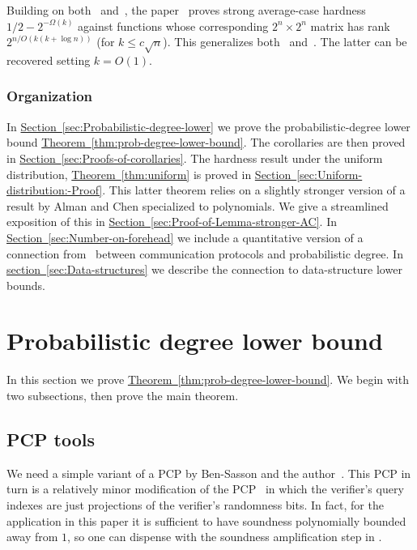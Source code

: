 \documentclass[11pt]{article}
\newcommand{\expref}[2]{\texorpdfstring{\hyperref[#2]{#1~\ref{#2}}}{#1~\ref{#2}}}
\begin{document}
Building on both~\cite{ChenLW2020-almost} and~\cite{DBLP:journals/corr/abs-2005-03123},
the paper~\cite{Huang-Viola-average-case-rigidity} proves strong
average-case hardness $1/2-2^{-\Omega(k)}$ against functions whose
corresponding $2^{n}\times2^{n}$ matrix has rank $2^{n/O(k(k+\log n))}$
(for $k\le c\sqrt{n}$). This generalizes both~\cite{ChenLW2020-almost}
and~\cite{DBLP:journals/corr/abs-2005-03123}. The latter can be recovered
setting $k=O(1)$.

\subsubsection{Organization}

In \expref{Section}{sec:Probabilistic-degree-lower} we prove the probabilistic-degree
lower bound \expref{Theorem}{thm:prob-degree-lower-bound}. The corollaries
are then proved in \expref{Section}{sec:Proofs-of-corollaries}. The hardness
result under the uniform distribution, \expref{Theorem}{thm:uniform}
is proved in \expref{Section}{sec:Uniform-distribution:-Proof}. This
latter theorem relies on a slightly stronger version of a result by
Alman and Chen specialized to polynomials. We give a streamlined exposition
of this in \expref{Section}{sec:Proof-of-Lemma-stronger-AC}. In \expref{Section}{sec:Number-on-forehead} we include a quantitative version of
a connection from~\cite{Viola-map} between communication protocols
and probabilistic degree. In \expref{section}{sec:Data-structures} we
describe the connection to data-structure lower bounds.

\section{Probabilistic degree lower bound \label{sec:Probabilistic-degree-lower}}

In this section we prove \expref{Theorem}{thm:prob-degree-lower-bound}.
We begin with two subsections, then prove the main theorem.

\subsection{PCP tools \label{subsec:PCP-tools}}

We need a simple variant of a PCP by Ben-Sasson and the author~\cite{Ben-SassonV-AC0PCP}.
This PCP in turn is a relatively minor modification of the PCP~\cite{Ben-SassonGHSV05}
in which the verifier's query indexes are just projections of the
verifier's randomness bits. In fact, for the application in this paper
it is sufficient to have soundness polynomially bounded away from
$1$, so one can dispense with the soundness amplification step in
\cite{Ben-SassonV-AC0PCP}.
\end{document}
